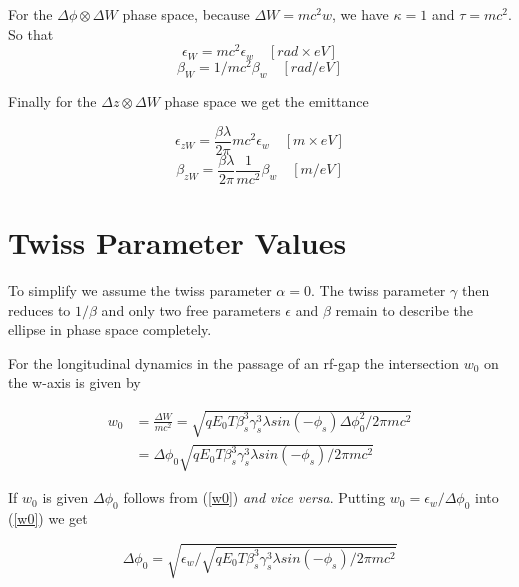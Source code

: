 \documentclass{article}
\begin{document}
For the $ \Delta\phi\otimes\Delta W $ phase space, because $ \Delta W = mc^{2} w $, we have $ \kappa = 1 $ and $ \tau = mc^{2} $.
So that 
\begin{equation}
\epsilon_{W} = mc^{2}\epsilon_{w}\quad [rad\times eV] \label{}
\end{equation}
\begin{equation}
\beta_{W} = 1/mc^{2}\beta_{w}\quad  [rad/eV] \label{}
\end{equation}

Finally for the $ \Delta z\otimes\Delta W $ phase space we get the emittance

\begin{equation}
\epsilon_{zW} = \frac{\beta \lambda} {2 \pi}mc^{2}\epsilon_{w}\quad  [m\times eV] \label{}
\end{equation}
\begin{equation}
\beta_{zW} = \frac{\beta \lambda} {2 \pi}\frac{1}{mc^{2}}\beta_{w}\quad  [m/eV] \label{}
\end{equation}



\section{Twiss Parameter Values}
To simplify we assume the twiss parameter $ \alpha = 0 $. The twiss  parameter $ \gamma $ then reduces to $ 1/{\beta} $
and only two free parameters $ \epsilon $ and $ \beta $ remain to describe the ellipse in phase space completely.

For the longitudinal dynamics in the passage of an rf-gap the intersection \(w_{0}\) on the w-axis is given by

\begin{align}
w_{0}&=\frac{\Delta W} {mc^{2}} = \sqrt{qE_{0}T\beta_{s}^{3}\gamma_{s}^{3}\lambda sin(-\phi_{s})\Delta\phi_{0}^{2}/2\pi mc^{2}} \\
     &= \Delta\phi_{0}\sqrt{qE_{0}T\beta_{s}^{3}\gamma_{s}^{3}\lambda sin(-\phi_{s})/2\pi mc^{2}} \label{w0}
\end{align}

If $w_{0}$ is given $\Delta\phi_{0}$ follows from (\ref{w0}) \emph{and vice versa}. Putting $ w_{0} = \epsilon_{w}/\Delta\phi_{0}$ into (\ref{w0})
we get

\begin{equation}
\Delta\phi_{0} = \sqrt{\epsilon_{w}/\sqrt{qE_{0}T\beta_{s}^{3}\gamma_{s}^{3}\lambda sin(-\phi_{s})/2\pi mc^{2}}} \label{w1}
\end{equation}
\end{document}
